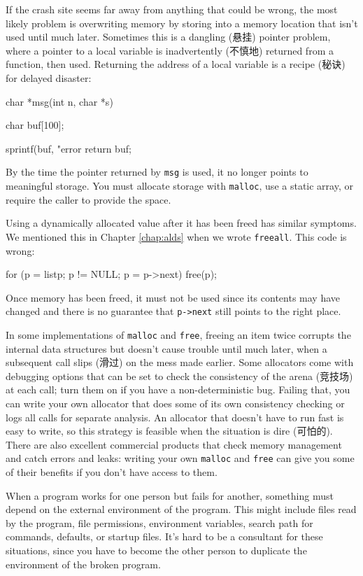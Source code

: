 If the crash site seems far away from anything that could be wrong, the
most likely problem is overwriting memory by storing into a memory location
that isn't used until much later. Sometimes this is a dangling (悬挂)
pointer problem, where a pointer to a local variable is inadvertently
(不慎地) returned from a function, then used. Returning the address of a
local variable is a recipe (秘诀) for delayed disaster:
\begin{badcode}
    char *msg(int n, char *s)
    {
        char buf[100];

        sprintf(buf, "error %
        return buf;
    }
\end{badcode}
By the time the pointer returned by \verb'msg' is used, it no longer points
to meaningful storage. You must allocate storage with \verb'malloc', use a
static array, or require the caller to provide the space.

Using a dynamically allocated value after it has been freed has similar
symptoms. We mentioned this in Chapter \ref{chap:alds} when we wrote
\verb'freeall'. This code is wrong:
\begin{badcode}
    for (p = listp; p != NULL; p = p->next)
        free(p);
\end{badcode}
Once memory has been freed, it must not be used since its contents may have
changed and there is no guarantee that \verb'p->next' still points to the
right place.

In some implementations of \verb'malloc' and \verb'free', freeing an item
twice corrupts the internal data structures but doesn't cause trouble until
much later, when a subsequent call slips (滑过) on the mess made earlier.
Some allocators come with debugging options that can be set to check the
consistency of the arena (竞技场) at each call; turn them on if you have a
non-deterministic bug. Failing that, you can write your own allocator that
does some of its own consistency checking or logs all calls for separate
analysis. An allocator that doesn't have to run fast is easy to write, so
this strategy is feasible when the situation is dire (可怕的). There are
also excellent commercial products that check memory management and catch
errors and leaks: writing your own \verb'malloc' and \verb'free' can give
you some of their benefits if you don't have access to them.

When a program works for one person but fails for another, something must
depend on the external environment of the program. This might include files
read by the program, file permissions, environment variables, search path
for commands, defaults, or startup files. It's hard to be a consultant for
these situations, since you have to become the other person to duplicate
the environment of the broken program.

